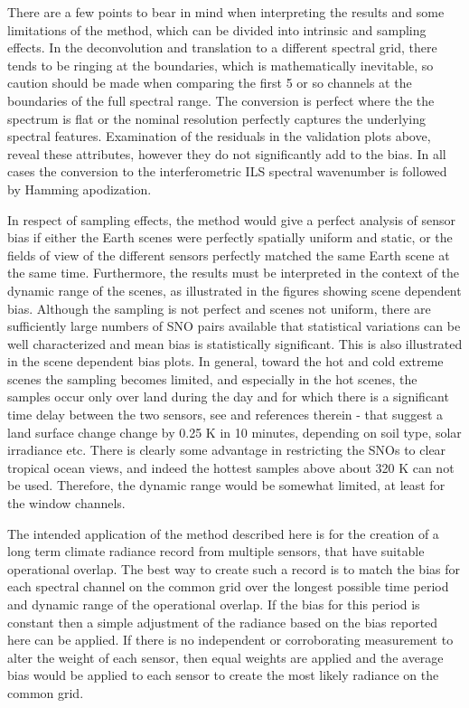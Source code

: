 \documentclass[twocolumn,10pt]{article}
\begin{document}
There are a few points to bear in mind when interpreting the results and some limitations of the method, which can be divided into intrinsic and sampling effects. In the deconvolution and translation to a different spectral grid, there tends to be ringing at the boundaries, which is mathematically inevitable, so caution should be made when comparing the first 5 or so channels at the boundaries of the full spectral range. The conversion is perfect where the the spectrum is flat or the nominal resolution perfectly captures the underlying spectral features. Examination of the residuals in the validation plots above, reveal these attributes, however they do not significantly add to the bias. In all cases the conversion to the interferometric ILS spectral wavenumber is followed by Hamming apodization.

In respect of sampling effects, the method would give a perfect analysis of sensor bias if either the Earth scenes were perfectly spatially uniform and static, or the fields of view of the different sensors perfectly matched the same Earth scene at the same time. Furthermore, the results must be interpreted in the context of the dynamic range of the scenes, as illustrated in the figures showing scene dependent bias. Although the sampling is not perfect and scenes not uniform, there are sufficiently large numbers of SNO pairs available that statistical variations can be well characterized and mean bias is statistically significant. This is also illustrated in the scene dependent bias plots. In general, toward the hot and cold extreme scenes the sampling becomes limited, and especially in the hot scenes, the samples occur only over land during the day and for which there is a significant time delay between the two sensors, see \cite{Duan2014} and references therein - that suggest a land surface change change by 0.25 K in 10 minutes, depending on soil type, solar irradiance etc. There is clearly some advantage in restricting the SNOs to clear tropical ocean views, and indeed the hottest samples above about 320 K can not be used. Therefore, the dynamic range would be somewhat limited, at least for the window channels. 

The intended application of the method described here is for the creation of a long term climate radiance record from multiple sensors, that have suitable operational overlap. The best way to create such a record is to match the bias for each spectral channel on the common grid over the longest possible time period and dynamic range of the operational overlap. If the bias for this period is constant then a simple adjustment of the radiance based on the bias reported here can be applied. If there is no independent or corroborating measurement to alter the weight of each sensor, then equal weights are applied and the average bias would be applied to each sensor to create the most likely radiance on the common grid.
\end{document}
